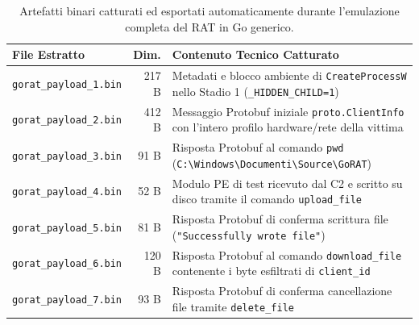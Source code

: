 \documentclass[11pt, a4paper]{article}
\renewcommand{\arraystretch}{1.28}
\begin{document}
\begin{table}[!htbp]
	\centering
	\footnotesize
	\setlength{\tabcolsep}{5pt}
	\renewcommand{\arraystretch}{1.32}
	\begin{tabularx}{\textwidth}{|l|r|Y|}
		\hline
		\textbf{File Estratto} & \textbf{Dim.} & \textbf{Contenuto Tecnico Catturato} \\
		\hline
		\texttt{gorat\_\allowbreak{}payload\_\allowbreak{}1.\allowbreak{}bin} & 217 B & Metadati e blocco ambiente di \texttt{Create\allowbreak{}ProcessW} nello Stadio 1 (\texttt{\_HIDDEN\_\allowbreak{}CHILD=1}) \\
		\hline
		\texttt{gorat\_\allowbreak{}payload\_\allowbreak{}2.\allowbreak{}bin} & 412 B & Messaggio Protobuf iniziale \texttt{proto.\allowbreak{}ClientInfo} con l'intero profilo hardware/rete della vittima \\
		\hline
		\texttt{gorat\_\allowbreak{}payload\_\allowbreak{}3.\allowbreak{}bin} & 91 B & Risposta Protobuf al comando \texttt{pwd} (\texttt{C:\textbackslash\allowbreak{}Windows\textbackslash\allowbreak{}Documenti\textbackslash\allowbreak{}Source\textbackslash\allowbreak{}GoRAT}) \\
		\hline
		\texttt{gorat\_\allowbreak{}payload\_\allowbreak{}4.\allowbreak{}bin} & 52 B & Modulo PE di test ricevuto dal C2 e scritto su disco tramite il comando \texttt{upload\_\allowbreak{}file} \\
		\hline
		\texttt{gorat\_\allowbreak{}payload\_\allowbreak{}5.\allowbreak{}bin} & 81 B & Risposta Protobuf di conferma scrittura file (\texttt{"Successfully wrote file"}) \\
		\hline
		\texttt{gorat\_\allowbreak{}payload\_\allowbreak{}6.\allowbreak{}bin} & 120 B & Risposta Protobuf al comando \texttt{download\_\allowbreak{}file} contenente i byte esfiltrati di \texttt{client\_\allowbreak{}id} \\
		\hline
		\texttt{gorat\_\allowbreak{}payload\_\allowbreak{}7.\allowbreak{}bin} & 93 B & Risposta Protobuf di conferma cancellazione file tramite \texttt{delete\_\allowbreak{}file} \\
		\hline
	\end{tabularx}
	\caption{Artefatti binari catturati ed esportati automaticamente durante l'emulazione completa del RAT in Go generico.}
	\label{tab:gorat_payloads}
\end{table}
\end{document}
